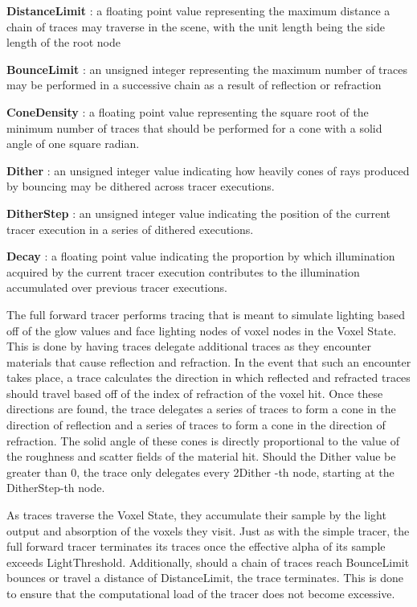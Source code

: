 \documentclass[onecolumn, draftclsnofoot,10pt, compsoc]{IEEEtran}
\newcounter{threesection}[subsubsection]
\begin{document}
\noindent \textbf{DistanceLimit} : a floating point value representing the maximum distance a chain of traces may traverse in the scene, with the unit length being the side length of the root node

\noindent \textbf{BounceLimit} : an unsigned integer representing the maximum number of traces may be performed in a successive chain as a result of reflection or refraction

\noindent \textbf{ConeDensity} : a floating point value representing the square root of the minimum number of traces that should be performed for a cone with a solid angle of one square radian.

\noindent \textbf{Dither} : an unsigned integer value indicating how heavily cones of rays produced by bouncing may be dithered across tracer executions.

\noindent \textbf{DitherStep} : an unsigned integer value indicating the position of the current tracer execution in a series of dithered executions.

\noindent \textbf{Decay} : a floating point value indicating the proportion by which illumination acquired by the current tracer execution contributes to the illumination accumulated over previous tracer executions.


The full forward tracer performs tracing that is meant to simulate lighting based off of the glow values and face lighting nodes of voxel nodes in the Voxel State. This is done by having traces delegate additional traces as they encounter materials that cause reflection and refraction. In the event that such an encounter takes place, a trace calculates the direction in which reflected and refracted traces should travel based off of the index of refraction of the voxel hit. Once these directions are found, the trace delegates a series of traces to form a cone in the direction of reflection and a series of traces to form a cone in the direction of refraction. The solid angle of these cones is directly proportional to the value of the roughness and scatter fields of the material hit. Should the Dither value be greater than 0, the trace only delegates every 2Dither -th node, starting at the DitherStep-th node.

As traces traverse the Voxel State, they accumulate their sample by the light output and absorption of the voxels they visit. Just as with the simple tracer, the full forward tracer terminates its traces once the effective alpha of its sample exceeds LightThreshold. Additionally, should a chain of traces reach BounceLimit bounces or travel a distance of DistanceLimit, the trace terminates. This is done to ensure that the computational load of the tracer does not become excessive.
\end{document}

